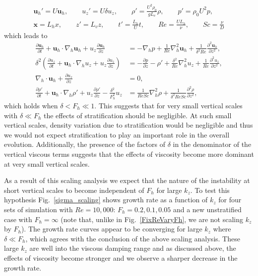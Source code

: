 \begin{align}
\textbf{u}_{h}' = U\textbf{u}_{h},\qquad u_{z}'=U\delta u_{z},\qquad \rho' =\frac{U^{2}\rho_{0}}{gL_{v}}\rho,\qquad p'=\rho_{0}U^{2}p, \nonumber\\
\textbf{x}=L_{h}x,\qquad z'=L_{v}z,\qquad t' = \frac{L_{h}}{U}{t},\qquad Re=\frac{UL_{h}}{\nu},\qquad Sc = \frac{\nu}{D}
\end{align} 
which leads to  
\begin{align}
\frac{\partial \textbf{u}_{h}}{\partial t} + \textbf{u}_{h}\cdot\nabla_{h}\textbf{u}_{h}+u_{z}\frac{\partial \textbf{u}_{h}}{\partial z} &= -\nabla_{h}p + \frac{1}{Re}\nabla_{h}^{2}\textbf{u}_{h} +  \frac{1}{\delta^{2}Re}\frac{\partial^{2}\textbf{u}_{h}}{\partial z^{2}},\\
\delta^{2}\left(\frac{\partial u_{z}}{\partial t} + \textbf{u}_{h}\cdot\nabla_{h}u_{z}+u_{z}\frac{\partial u_{z}}{\partial z}\right) &= -\frac{\partial p}{\partial z} - \rho' + \frac{\delta^{2}}{Re}\nabla_{h}^{2}u_{z} + \frac{1}{Re}\frac{\partial^{2}u_{z}}{\partial z^{2}},\\
\nabla_{h}\cdot\textbf{u}_{h} + \frac{\partial u_{z}}{\partial z} &=0,\\
\frac{\partial \rho'}{\partial t} + \textbf{u}_{h}\cdot\nabla_{h}\rho' + u_{z}\frac{\partial \rho'}{\partial z} -\frac{\delta^{2}}{F_{h}^{2}}u_{z}&=\frac{1}{ReSc}\nabla_{h}^{2}\rho + \frac{1}{\delta^{2}ReSc}\frac{\partial^{2}\rho}{\partial z^{2}},
\end{align}
which holds when $\delta<F_{h}\ll 1$. This suggests that for very small vertical scales with $\delta \ll  F_{h}$ the effects of stratification should be negligible. At such small vertical scales, density variation due to stratification would be negligible and thus we would not expect stratification to play an important role in the overall evolution. Additionally, the presence of the factors of $\delta$ in the denominator of the vertical viscous terms suggests that the effects of viscosity become more dominant at very small vertical scales.  

As a result of this scaling analysis we expect that the nature of the instability at short vertical scales to become independent of $F_{h}$ for large $k_{z}$. To test this hypothesis Fig.~\ref{sigma_scaling} shows growth rate as a function of $k_{z}$ for four sets of simulation with $Re=10{,}000$: $F_{h}=0.2,0.1,0.05$ and a new unstratified case with $F_{h}=\infty$ (note that, unlike in Fig.~\ref{FixReVaryFh}, we are not scaling $k_{z}$ by $F_{h}$). The growth rate curves appear to be converging for large $k_{z}$ where $\delta \ll F_{h}$, which agrees with the conclusion of the above scaling analysis. These large $k_{z}$ are well into the viscous damping range and as discussed above, the effects of viscosity become stronger and we observe a sharper decrease in the growth rate.

